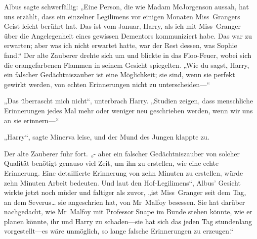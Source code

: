 Albus sagte schwerfällig: „Eine Person, die wie Madam McJorgenson aussah, hat uns erzählt, dass ein einzelner Legilimens vor einigen Monaten Miss~Grangers Geist leicht berührt hat. Das ist vom Januar, Harry, als ich mit Miss~Granger über die Angelegenheit eines gewissen Dementors kommuniziert habe. Das war zu erwarten; aber was ich nicht erwartet hatte, war der Rest dessen, was Sophie fand.“
Der alte Zauberer drehte sich um und blickte in das Floo-Feuer, wobei sich die orangefarbenen Flammen in seinem Gesicht spiegelten. „Wie du sagst, Harry, ein falscher Gedächtniszauber ist eine Möglichkeit; sie sind, wenn sie perfekt gewirkt werden, von echten Erinnerungen nicht zu unterscheiden—“

„Das überrascht mich nicht“, unterbrach Harry. „Studien zeigen, dass menschliche Erinnerungen jedes Mal mehr oder weniger neu geschrieben werden, wenn wir uns an sie erinnern—“

„Harry“, sagte Minerva leise, und der Mund des Jungen klappte zu.

Der alte Zauberer fuhr fort. „- aber ein falscher Gedächtniszauber von solcher Qualität benötigt genauso viel Zeit, um ihn zu erstellen, wie eine echte Erinnerung. Eine detaillierte Erinnerung von zehn Minuten zu erstellen, würde zehn Minuten Arbeit bedeuten. Und laut den Hof-Legilimens“, Albus' Gesicht wirkte jetzt noch müder und faltiger als zuvor, „ist Miss~Granger seit dem Tag, an dem Severus… sie angeschrien hat, von Mr~Malfoy besessen. Sie hat darüber nachgedacht, wie Mr~Malfoy mit Professor Snape im Bunde stehen könnte, wie er planen könnte, ihr und Harry zu schaden—sie hat sich das jeden Tag stundenlang vorgestellt—es wäre unmöglich, so lange falsche Erinnerungen zu erzeugen.“

